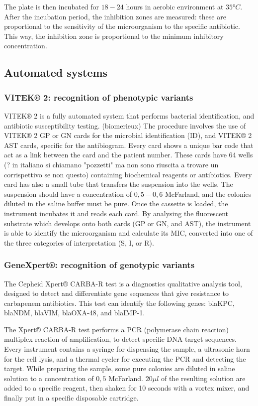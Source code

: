 \documentclass[11pt]{report}
\begin{document}
The plate is then incubated for $18-24$ hours in aerobic environment at $35°C$.
After the incubation period, the inhibition zones are measured: these are proportional to the sensitivity of the microorganism to the specific antibiotic. 
This way, the inhibition zone is proportional to the minimum inhibitory concentration.

\subsection{Automated systems}
\subsubsection{VITEK® 2: recognition of phenotypic variants}
VITEK® 2 is a fully automated system that performs bacterial identification, and antibiotic susceptibility testing. (biomerieux) %
The procedure involves the use of VITEK® 2 GP or GN cards for the microbial identification (ID), and VITEK® 2 AST cards, specific for the antibiogram.
Every card shows a unique bar code that act as a link between the card and the patient number.
These cards have 64 wells (? in italiano si chiamano "pozzetti" ma non sono riuscita a trovare un corrispettivo se non questo) containing biochemical reagents or antibiotics. Every card has also a small tube that transfers the suspension into the wells.
The suspension should have a concentration of $0,5-0,6$ McFarland, and the colonies diluted in the saline buffer must be pure.
Once the cassette is loaded, the instrument incubates it and reads each card.
By analysing the fluorescent substrate which develops onto both cards (GP or GN, and AST), the instrument is able to identify the microorganism and calculate its MIC, converted into one of the three categories of interpretation (S, I, or R).

\subsubsection{GeneXpert®: recognition of genotypic variants}
The Cepheid Xpert® CARBA-R test is a diagnostics qualitative analysis tool, designed to detect and differentiate gene sequences that give resistance to carbapenem antibiotics.
This test can identify the following genes: blaKPC, blaNDM, blaVIM, blaOXA-48, and blaIMP-1.

The Xpert® CARBA-R test performs a PCR (polymerase chain reaction) multiplex reaction of amplification, to detect specific DNA target sequences.
Every instrument contains a syringe for dispensing the sample, a ultrasonic horn for the cell lysis, and a thermal cycler for executing the PCR and detecting the target.
While preparing the sample, some pure colonies are diluted in saline solution to a concentration of $0,5$ McFarland. 
$20\mu l$ of the resulting solution are added to a specific reagent, then shaken for 10 seconds with a vortex mixer, and finally put in a specific disposable cartridge.
\end{document}
